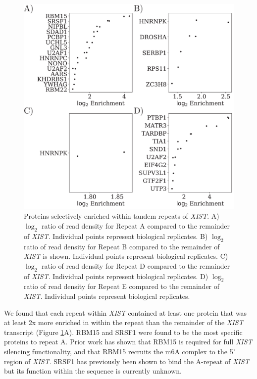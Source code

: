 \begin{figure}[h!]
\centering
\includegraphics[width=\textwidth]{images/sigproteins.pdf}
\caption{Proteins selectively enriched within tandem repeats of \emph{XIST}. A) $\log_2$ ratio of read density for Repeat A compared to the remainder of \emph{XIST}. Individual points represent biological replicates. B) $\log_2$ ratio of read density for Repeat B compared to the remainder of \emph{XIST} is shown. Individual points represent biological replicates. C) $\log_2$ ratio of read density for Repeat D compared to the remainder of \emph{XIST}. Individual points represent biological replicates. D) $\log_2$ ratio of read density for Repeat E compared to the remainder of \emph{XIST}. Individual points represent biological replicates.}
\label{fig:xistproteins}
\end{figure}

We found that each repeat within \emph{XIST} contained at least one protein that was at least 2x more enriched in within the repeat than the remainder of the \emph{XIST} transcript (Figure \ref{fig:xistproteins}A). RBM15 and SRSF1 were found to be the most specific proteins to repeat A. Prior work has shown that RBM15 is required for full \emph{XIST} silencing functionality, and that RBM15 recruits the m6A complex to the 5' region of \emph{XIST}. SRSF1 has previously been shown to bind the A-repeat of \emph{XIST} but its function within the sequence is currently unknown.


